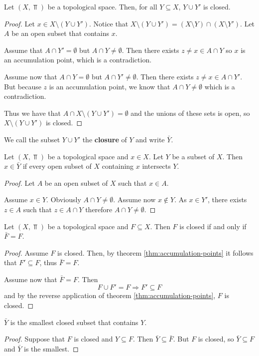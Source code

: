 \documentclass[../../main/main.tex]{subfiles}
\begin{document}
\begin{remark}
  Let $(X, \Top)$ be a topological space. Then, for all $Y \subseteq X$, $Y \cup Y'$ is closed.
\end{remark}
\begin{proof}
  Let $x \in X \setminus (Y \cup Y')$. Notice that $X \setminus (Y \cup Y') = (X \setminus Y) \cap (X \setminus Y')$. Let $A$ be an open subset that contains $x$.

  Assume that $A \cap Y' = \emptyset$ but $A \cap Y \neq \emptyset$. Then there exists $z \neq x \in A \cap Y$ so $x$ is an accumulation point, which is a contradiction.

  Assume now that $A \cap Y = \emptyset$ but $A \cap Y' \neq \emptyset$. Then there exists $z \neq x \in A \cap Y'$. But because $z$ is an accumulation point, we know that $A \cap Y \neq \emptyset$ which is a contradiction.

  Thus we have that $A \cap X \setminus (Y \cup Y') = \emptyset$ and the unions of these sets is open, so $X \setminus (Y \cup Y')$ is closed.
\end{proof}

\begin{definition}
  We call the subset $Y \cup Y'$ the {\bf closure} of $Y$ and write $\bar{Y}$.
\end{definition}

\begin{remark}
  Let $(X, \Top)$ be a topological space and $x \in X$. Let $Y$ be a subset of $X$. Then $x \in \bar{Y}$ if every open subset of $X$ containing $x$ intersects $Y$.
\end{remark}
\begin{proof}
  Let $A$ be an open subset of $X$ such that $x \in A$.

  Assume $x \in Y$. Obviously $A \cap Y \neq \emptyset$. Assume now $x \notin Y$. As $x \in Y'$, there exists $z \in A$ such that $z \in A \cap Y$ therefore $A \cap Y \neq \emptyset$.
\end{proof}

\begin{corolary}
  Let $(X, \Top)$ be a topological space and $F \subseteq X$. Then $F$ is closed if and only if $\bar{F} = F$.
\end{corolary}
\begin{proof}
  Assume $F$ is closed. Then, by theorem \ref{thm:accumulation-points} it follows that $F' \subseteq F$, thus $\bar{F} = F$.

  Assume now that $\bar{F} = F$. Then
    \begin{equation*}
      F \cup F' = F \Longrightarrow F' \subseteq F
    \end{equation*}
    and by the reverse application of theorem \ref{thm:accumulation-points}, $F$ is closed.
\end{proof}

\begin{corolary}
  $\bar{Y}$ is the smallest closed subset that contains $Y$.
\end{corolary}
\begin{proof}
  Suppose that $F$ is closed and $Y \subseteq F$. Then $\bar{Y} \subseteq \bar{F}$. But $F$ is closed, so $\bar{Y} \subseteq F$ and $\bar{Y}$ is the smallest.
\end{proof}
\end{document}

